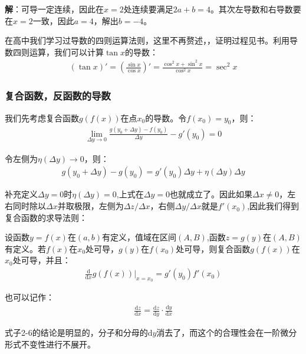 \documentclass{ctexart}
\let\oldtextbf\textbf %
\renewcommand{\textbf}[1]{\textcolor{btex}{\oldtextbf{#1}}} %
\begin{document}
\textbf{解}：可导一定连续，因此在$x=2$处连续要满足$2a+b=4$。其次左导数和右导数要在$x=2$一致，因此$a=4$，解出$b=-4$。

在高中我们学习过导数的四则运算法则，这里不再赘述，，证明过程见书。利用导数四则运算，我们可以计算$\tan x$的导数：
\begin{align*}
    (\tan x)'=(\frac{\sin x}{\cos x})'=\frac{\cos^2 x+\sin ^2 x}{\cos ^2 x}=\sec^2 x
\end{align*}

\subsubsection{复合函数，反函数的导数}
我们先考虑复合函数$g(f(x))$在点$x_0$的导数。令$f(x_0)=y_0$，则：
\begin{align*}
    \lim_{\Delta y\to 0}\frac{g(y_0+\Delta y)-f(y_0)}{\Delta y}-g'(y_0)=0
\end{align*}

令左侧为$\eta(\Delta y)\to 0$，则：
\begin{align*}
    g(y_0+\Delta y)-g(y_0)=g'(y_0)\Delta y+\eta(\Delta y)\Delta y
\end{align*}

补充定义$\Delta y=0$时$\eta(\Delta y)=0$,上式在$\Delta y=0$也就成立了。因此如果$\Delta x\neq 0$，左右同时除以$\Delta x$并取极限，左侧为$\Delta z/\Delta x$，右侧$\Delta y/\Delta x$就是$f'(x_0)$,因此我们得到复合函数的求导法则：
\begin{tcolorbox}[
    colback=bac1,     %
    colframe=fra1,   %
    coltitle=white,             %
    coltext=tex1,
    title=复合函数的求导法则,
    fonttitle=\bfseries,        %
arc=3mm,                     %
breakable
]
设函数$y=f(x)$在$(a,b)$有定义，值域在区间$(A,B)$,函数$z=g(y)$在$(A,B)$有定义。若$f(x)$在$x_0$处可导，$g(y)$在$f(x_0)$处可导，则复合函数$g(f(x))$在$x_0$处可导，并且：
\begin{align*}
    \frac{\mathrm{d}}{\mathrm{d}x}g(f(x))|_{x=x_0}=g'(y_0)f'(x_0)
\end{align*}

也可以记作：
\begin{align*}
    \frac{\mathrm{d}z}{\mathrm{d}x}=\frac{\mathrm{d}z}{\mathrm{d}y}\cdot\frac{\mathrm{d}y}{\mathrm{d}x}\tag{2-6}
\end{align*}
\end{tcolorbox}

式子2-6的结论是明显的，分子和分母的$\mathrm{d}y$消去了，而这个的合理性会在一阶微分形式不变性进行不展开。
\end{document}
